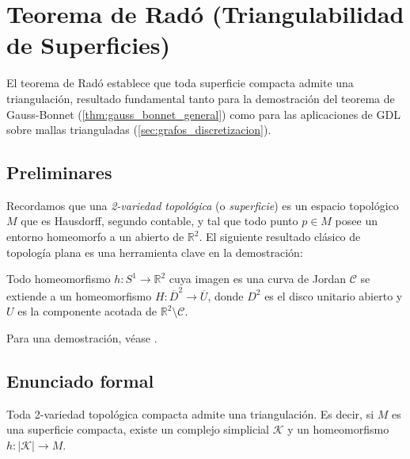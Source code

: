 \section{Teorema de Radó (Triangulabilidad de Superficies)}\label{sec:rado}

El teorema de Radó establece que toda superficie compacta admite una triangulación, resultado fundamental tanto para la demostración del teorema de Gauss-Bonnet (\autoref{thm:gauss_bonnet_general}) como para las aplicaciones de \gls{GDL} sobre mallas trianguladas (\autoref{sec:grafos_discretizacion}).

\subsection*{Preliminares}

Recordamos que una \textit{2-variedad topológica} (o \textit{superficie}) es un espacio topológico $M$ que es Hausdorff, segundo contable, y tal que todo punto $p \in M$ posee un entorno homeomorfo a un abierto de $\mathbb{R}^2$. El siguiente resultado clásico de topología plana es una herramienta clave en la demostración:

\begin{theorem}\label{thm:jordan_schoenflies}
Todo homeomorfismo $h: S^1 \to \mathbb{R}^2$ cuya imagen es una curva de Jordan $\mathcal{C}$ se extiende a un homeomorfismo $H: \overline{D}^2 \to \overline{U}$, donde $D^2$ es el disco unitario abierto y $U$ es la componente acotada de $\mathbb{R}^2 \setminus \mathcal{C}$.
\end{theorem}

Para una demostración, véase \citet[Cap.~4]{moise1977geometric}.

\subsection*{Enunciado formal}

\begin{theorem}\label{thm:rado_apendice}
Toda 2-variedad topológica compacta admite una triangulación. Es decir, si $M$ es una superficie compacta, existe un complejo simplicial $\mathcal{K}$ y un homeomorfismo $h: |\mathcal{K}| \to M$.
\end{theorem}

